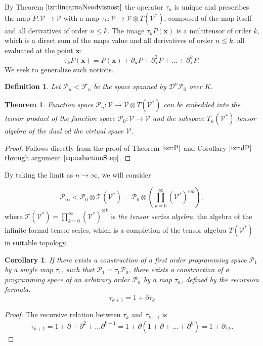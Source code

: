 \documentclass[preprint,12pt]{elsarticle}
\newcommand{\T}{\mathcal{T}}
\newcommand{\VV}{\mathcal{V}}
\newcommand{\x}{\mathbf{x}}
\newcommand{\F}{\mathcal{F}}
\newcommand{\dP}{\mathcal{P}}
\newcommand{\D}{\partial}
\newcommand{\DD}{\mathcal{D}}
\newcommand{\sumd}{\tau}
\newtheorem{definicija}{Definition}[section]
\newtheorem{izrek}{Theorem}[section]
\newtheorem{corollary}{Corollary}[section]
\begin{document}
  By Theorem $\ref{izr:linearnaNeodvisnost}$ the operator $\sumd_n$ is unique and prescribes the map $P: \VV\to \VV$ with a map $\sumd_k:\VV\to
\VV\otimes T(\VV^*)$, composed of the map itself and all derivatives of order $n\le k$. The image $\sumd_kP(\x)$ is a multitensor of order $k$, which is a direct sum of the maps value and all derivatives of order $n\le k$, all evaluated at the point $\x$:
\begin{equation}
  \label{eq:multi_odvod}
  \sumd_kP(\x) = P(\x)+\D_\x P + \D^2_\x P + \ldots + \D^k_\x P.
\end{equation}
We seek to generalize such notions.

\begin{definicija}\label{def:P_n}
Let $\dP_n<\F_n$ be the space spanned by $\DD^n\dP_0$ over $K$.
 \end{definicija}
 
 \begin{izrek}\label{izr:P_n}
 	Function space $\dP_n:\VV\to \VV\otimes T(\VV^*)$ can be embedded into the tensor
  product of the function space $\dP_0:\VV\to \VV$ and the subspace $T_n(\VV^*)$
  tensor algebra of the dual od the virtual space $\VV$. 
 \end{izrek}
 
 \begin{proof} Follows directly from the proof of Theorem $\ref{izr:P}$ and Corollary $\ref{izr:dP}$ through argument $\eqref{eq:inductionStep}$.
  \end{proof}
By taking the limit as $n\to \infty$, we will consider 
 	
 	\begin{equation}
 	\label{eq:P_algebra}
 	 	    \dP_\infty < \dP_0\otimes \T(\VV^*) = \dP_0 \otimes\left(\prod_{k=0}^\infty (\VV^*)^{\otimes k} \right),
 	\end{equation}
where $\T(\VV^*)=\prod_{k=0}^\infty (\VV^*)^{\otimes k}$ is \emph{the tensor series
  algebra}, the algebra of the  infinite formal tensor series,
which is a completion of the tensor algebra $T(\VV^*)$ in suitable topology.
  \begin{corollary}
  If there exists a construction of a first order programming space $\dP_1$ by a
  single map $\sumd_1$, such that $\dP_1=\sumd_1\dP_0$, there exists a
  construction of a programming space of an arbitrary order $\dP_n$ by a map
  $\sumd_n$, defined by the recursion formula.
  \begin{equation}
    \label{eq:potenca(1+d)}
    \sumd_{k+1}=1+\D\sumd_{k}
  \end{equation}

  \end{corollary}
  \begin{proof}
    The recursive relation between $\sumd_k$ and $\sumd_{k+1}$ is
    \begin{equation}
      \label{eq:rekurzija}
      \sumd_{k+1} = 1 + \D +\D^2+\ldots \D^{k+1} = 1+\D(1+\D+\ldots +\D^{k}) = 1+\D\sumd_k.
    \end{equation} 

  \end{proof}
       
\end{document}
